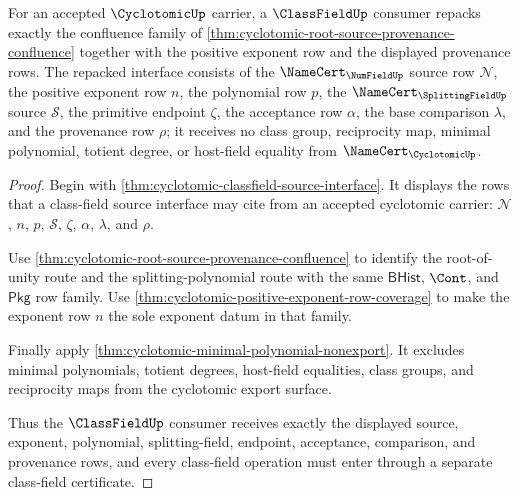 \begin{theorem}
\label{thm:cyclotomic-classfield-repack-exactness}
For an accepted $\CyclotomicUp$ carrier, a $\ClassFieldUp$ consumer repacks exactly the confluence family of \autoref{thm:cyclotomic-root-source-provenance-confluence} together with the positive exponent row and the displayed provenance rows. The repacked interface consists of the $\NameCert_{\NumFieldUp}$ source row $\mathcal{N}$, the positive exponent row $n$, the polynomial row $p$, the $\NameCert_{\SplittingFieldUp}$ source $\mathcal{S}$, the primitive endpoint $\zeta$, the acceptance row $\alpha$, the base comparison $\lambda$, and the provenance row $\rho$; it receives no class group, reciprocity map, minimal polynomial, totient degree, or host-field equality from $\NameCert_{\CyclotomicUp}$.
\end{theorem}
\begin{proof}
Begin with \autoref{thm:cyclotomic-classfield-source-interface}. It displays the rows that a class-field source interface may cite from an accepted cyclotomic carrier: $\mathcal{N}$, $n$, $p$, $\mathcal{S}$, $\zeta$, $\alpha$, $\lambda$, and $\rho$.

Use \autoref{thm:cyclotomic-root-source-provenance-confluence} to identify the root-of-unity route and the splitting-polynomial route with the same $\mathsf{BHist}$, $\Cont$, and $\mathsf{Pkg}$ row family. Use \autoref{thm:cyclotomic-positive-exponent-row-coverage} to make the exponent row $n$ the sole exponent datum in that family.

Finally apply \autoref{thm:cyclotomic-minimal-polynomial-nonexport}. It excludes minimal polynomials, totient degrees, host-field equalities, class groups, and reciprocity maps from the cyclotomic export surface.

Thus the $\ClassFieldUp$ consumer receives exactly the displayed source, exponent, polynomial, splitting-field, endpoint, acceptance, comparison, and provenance rows, and every class-field operation must enter through a separate class-field certificate.
\end{proof}

